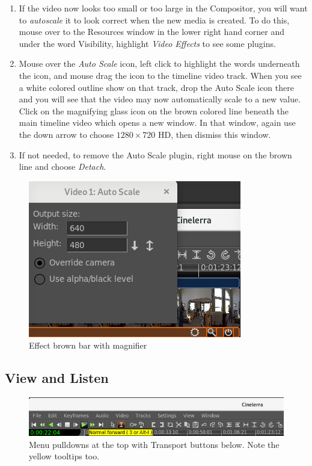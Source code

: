 \begin{enumerate}[resume]	
	\item If the video now looks too small or too large in the Compositor, you will want to \textit{autoscale} it to
	look correct when the new media is created.  To do this, mouse over to the Resources window in the
	lower right hand corner and under the word Visibility, highlight \textit{Video Effects} to see some
	plugins.
	\item Mouse over the \textit{Auto Scale} icon, left click to highlight the words underneath the icon, and mouse
	drag the icon to the timeline video track.  When you see a white colored outline show on that track,
	drop the Auto Scale icon there and you will see that the video may now automatically scale to a
	new value.  Click on the magnifying glass icon on the brown colored line beneath the main timeline
	video which opens a new window.  In that window, again use the down arrow to choose $1280\times720$
	HD, then dismiss this window.
	\item If not needed, to remove the Auto Scale plugin, right mouse on the brown line and choose \textit{Detach}.
\end{enumerate}

\begin{figure}[htpb]
	\centering
	\includegraphics[width=0.5\linewidth]{images/magnifier.png}
	\caption{Effect brown bar with magnifier}	
\end{figure}

\subsection{View and Listen}%
\label{sub:view_listen}

\begin{figure}[htpb]
	\centering
	\includegraphics[width=1.0\linewidth]{images/pulldown_button.png}
	\caption{Menu pulldowns at the top with Transport buttons below.  Note the yellow tooltips too.}	
\end{figure}

